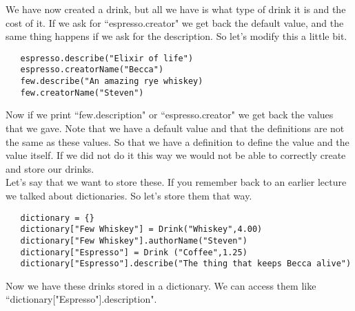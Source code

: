\documentclass[11pt]{article}   %
\begin{document}
We have now created a drink, but all we have is what type of drink it is and the cost of it.  If we ask for ``espresso.creator" we get back the default value,
and the same thing happens if we ask for the description.  So let's modify this a little bit.
\begin{tcolorbox}
   \begin{lstlisting}
   espresso.describe("Elixir of life")
   espresso.creatorName("Becca")
   few.describe("An amazing rye whiskey)
   few.creatorName("Steven")
   \end{lstlisting}
\end{tcolorbox}
Now if we print ``few.description" or ``espresso.creator" we get back the values that we gave.  Note that we have a default value and that the 
definitions are not the same as these values.  So that we have a definition to define the value and the value itself.  If we did not do it this way we
would not be able to correctly create and store our drinks.
\\
Let's say that we want to store these.  If you remember back to an earlier lecture we talked about dictionaries.  So let's store them that way.
\begin{tcolorbox}
   \begin{lstlisting}
   dictionary = {}
   dictionary["Few Whiskey"] = Drink("Whiskey",4.00)
   dictionary["Few Whiskey"].authorName("Steven")
   dictionary["Espresso"] = Drink ("Coffee",1.25)
   dictionary["Espresso"].describe("The thing that keeps Becca alive")
   \end{lstlisting}
\end{tcolorbox}
Now we have these drinks stored in a dictionary.  We can access them like ``dictionary["Espresso"].description".  
\end{document}
